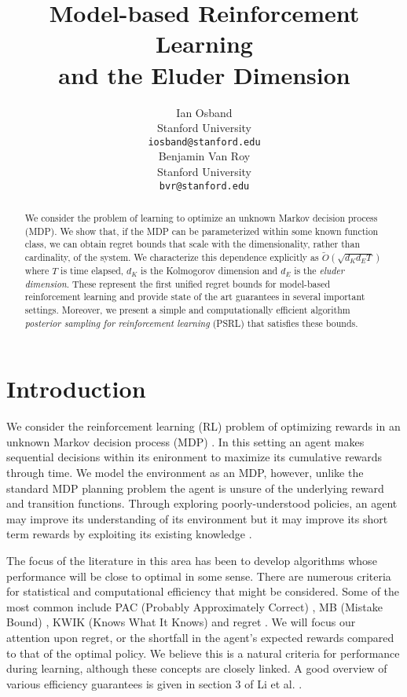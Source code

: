 \documentclass{article}
\title{Model-based Reinforcement Learning \\ and the Eluder Dimension}
\author{Ian Osband \\
Stanford University \\
\texttt{iosband@stanford.edu} \\
\And
Benjamin Van Roy \\
Stanford University \\
\texttt{bvr@stanford.edu}}
\begin{document}
\maketitle


\begin{abstract}
We consider the problem of learning to optimize an unknown Markov decision process (MDP).
We show that, if the MDP can be parameterized within some known function class, we can obtain regret bounds that scale with the dimensionality, rather than cardinality, of the system.
We characterize this dependence explicitly as $\tilde{O}(\sqrt{d_K d_E T})$ where $T$ is time elapsed, $d_K$ is the Kolmogorov dimension and $d_E$ is the \emph{eluder dimension}.
These represent the first unified regret bounds for model-based reinforcement learning and provide state of the art guarantees in several important settings.
Moreover, we present a simple and computationally efficient algorithm \emph{posterior sampling for reinforcement learning} (PSRL) that satisfies these bounds.

\end{abstract}


\section{Introduction}

We consider the reinforcement learning (RL) problem of optimizing rewards in an unknown Markov decision process (MDP) \cite{burnetas1997optimal}.
In this setting an agent makes sequential decisions within its enironment to maximize its cumulative rewards through time.
We model the environment as an MDP, however, unlike the standard MDP planning problem the agent is unsure of the underlying reward and transition functions.
Through exploring poorly-understood policies, an agent may improve its understanding of its environment but it may improve its short term rewards by exploiting its existing knowledge \cite{lai1985asymptotically,kaelbling1996reinforcement}.

The focus of the literature in this area has been to develop algorithms whose performance will be close to optimal in some sense.
There are numerous criteria for statistical and computational efficiency that might be considered.
Some of the most common include PAC (Probably Approximately Correct) \cite{valiant1984theory}, MB (Mistake Bound) \cite{littlestone1988learning}, KWIK (Knows What It Knows) \cite{li2011knows} and regret \cite{jaksch2010near}.
We will focus our attention upon regret, or the shortfall in the agent's expected rewards compared to that of the optimal policy.
We believe this is a natural criteria for performance during learning, although these concepts are closely linked.
A good overview of various efficiency guarantees is given in section 3 of Li et al. \cite{li2011knows}.
\end{document}
